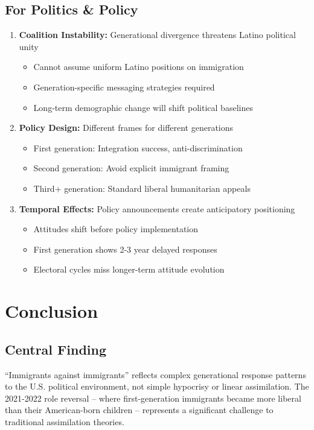 \documentclass[11pt,letterpaper]{article}
\begin{document}
\subsection{For Politics \& Policy}

\begin{enumerate}
    \item \textbf{Coalition Instability:} Generational divergence threatens Latino political unity
        \begin{itemize}
            \item Cannot assume uniform Latino positions on immigration
            \item Generation-specific messaging strategies required
            \item Long-term demographic change will shift political baselines
        \end{itemize}
    
    \item \textbf{Policy Design:} Different frames for different generations
        \begin{itemize}
            \item First generation: Integration success, anti-discrimination
            \item Second generation: Avoid explicit immigrant framing
            \item Third+ generation: Standard liberal humanitarian appeals
        \end{itemize}
        
    \item \textbf{Temporal Effects:} Policy announcements create anticipatory positioning
        \begin{itemize}
            \item Attitudes shift before policy implementation
            \item First generation shows 2-3 year delayed responses
            \item Electoral cycles miss longer-term attitude evolution
        \end{itemize}
\end{enumerate}

\section{Conclusion}

\subsection{Central Finding}
``Immigrants against immigrants'' reflects complex generational response patterns to the U.S. political environment, not simple hypocrisy or linear assimilation. The 2021-2022 role reversal -- where first-generation immigrants became more liberal than their American-born children -- represents a significant challenge to traditional assimilation theories.
\end{document}

